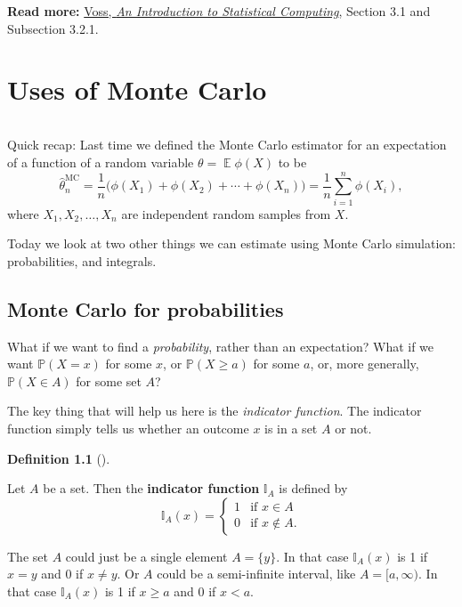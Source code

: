 \documentclass[
  letterpaper,
  DIV=11,
  numbers=noendperiod]{scrreprt}
\newcommand{\Exg}{\operatorname{\mathbb{E}}}
\newcommand{\Ind}{\mathbb{I}}
\theoremstyle{plain}
\theoremstyle{definition}
\newtheorem{definition}{Definition}[chapter]
\theoremstyle{definition}
\theoremstyle{remark}
\begin{document}
\textbf{Read more:}
\href{https://leeds.primo.exlibrisgroup.com/permalink/44LEE_INST/1fj430b/cdi_askewsholts_vlebooks_9781118728031}{Voss,
\emph{An Introduction to Statistical Computing}}, Section 3.1 and
Subsection 3.2.1.

\chapter{Uses of Monte Carlo}\label{uses-of-monte-carlo}

\[ \]

Quick recap: Last time we defined the Monte Carlo estimator for an
expectation of a function of a random variable \(\theta = \Exg \phi(X)\)
to be
\[ \widehat{\theta}_n^{\mathrm{MC}} = \frac{1}{n} \big(\phi(X_1) + \phi(X_2) + \cdots + \phi(X_n) \big) = \frac{1}{n} \sum_{i=1}^n \phi(X_i) , \]
where \(X_1, X_2, \dots, X_n\) are independent random samples from
\(X\).

Today we look at two other things we can estimate using Monte Carlo
simulation: probabilities, and integrals.

\section{Monte Carlo for
probabilities}\label{monte-carlo-for-probabilities}

What if we want to find a \emph{probability}, rather than an
expectation? What if we want \(\mathbb P(X = x)\) for some \(x\), or
\(\mathbb P(X \geq a)\) for some \(a\), or, more generally,
\(\mathbb P(X \in A)\) for some set \(A\)?

The key thing that will help us here is the \emph{indicator function}.
The indicator function simply tells us whether an outcome \(x\) is in a
set \(A\) or not.

\begin{definition}[]\protect\hypertarget{def-indicator}{}\label{def-indicator}

Let \(A\) be a set. Then the \textbf{indicator function} \(\Ind_A\) is
defined by
\[ \Ind_A(x) = \begin{cases} 1 & \text{if $x \in A$} \\ 0 & \text{if $x \notin A$.} \end{cases} \]

\end{definition}

The set \(A\) could just be a single element \(A = \{y\}\). In that case
\(\Ind_A(x)\) is 1 if \(x = y\) and 0 if \(x \neq y\). Or \(A\) could be
a semi-infinite interval, like \(A = [a, \infty)\). In that case
\(\Ind_A(x)\) is 1 if \(x \geq a\) and 0 if \(x < a\).
\end{document}
